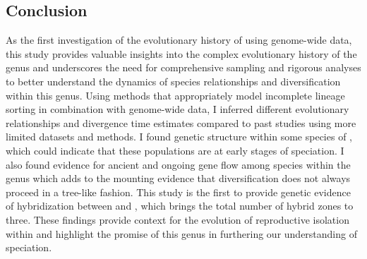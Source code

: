 \subsection{Conclusion}
As the first investigation of the evolutionary history of \anaxyrus using genome-wide 
data, this study provides
valuable insights into the complex evolutionary history 
of the genus and underscores the need for comprehensive sampling and 
rigorous analyses to better understand the dynamics of species relationships and 
diversification within this genus.
Using methods that appropriately model incomplete lineage sorting in combination
with genome-wide data, I inferred different evolutionary relationships and
divergence time estimates compared to past studies using more limited 
datasets and methods.
I found genetic structure within some species of \anaxyrus, which could indicate
that these populations are at early stages of speciation.
I also found evidence for ancient and ongoing gene flow among species within
the genus which adds to the mounting evidence that diversification does not always
proceed in a tree-like fashion. 
This study is the first to provide genetic evidence of hybridization between
\fowl and \wood, which brings the total number of hybrid zones to three.
These findings provide context for the evolution of reproductive isolation 
within \anaxyrus and highlight the promise of this genus in furthering our understanding of speciation.